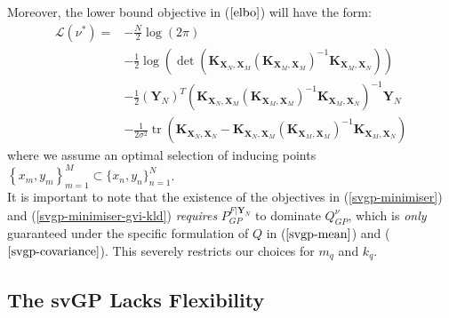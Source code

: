\documentclass{article}
\newcommand{\tr}{\operatorname{tr}}
\numberwithin{equation}{section}
\begin{document}
Moreover, the lower bound objective in ($\ref{elbo}$) will have the form:
\begin{align}
    \label{svgp-optimal-elbo}
    \mathcal{L}(\nu^*) = &-\frac{N}{2} \log\left(2\pi \right)\\
    &-\frac{1}{2} \log \left(\det\left( \mathbf{K}_{\mathbf{X}_N, \mathbf{X}_M}\left(\mathbf{K}_{\mathbf{X}_M, \mathbf{X}_M}\right)^{-1} \mathbf{K}_{\mathbf{X}_M, \mathbf{X}_N}\right)\right)\\
    & -\frac{1}{2} \left(\mathbf{Y}_N\right)^T \left( \mathbf{K}_{\mathbf{X}_N, \mathbf{X}_M}\left(\mathbf{K}_{\mathbf{X}_M, \mathbf{X}_M}\right)^{-1} \mathbf{K}_{\mathbf{X}_M, \mathbf{X}_N}\right)^{-1} \mathbf{Y}_N \\
    &  - \frac{1}{2\sigma^2}\tr\left(\mathbf{K}_{\mathbf{X}_N, \mathbf{X}_N} - \mathbf{K}_{\mathbf{X}_N, \mathbf{X}_M}\left(\mathbf{K}_{\mathbf{X}_M, \mathbf{X}_M}\right)^{-1} \mathbf{K}_{\mathbf{X}_M, \mathbf{X}_N}\right)
\end{align}
where we assume an optimal selection of inducing points $\left\{x_m, y_m\right\}_{m=1}^{M} \subset \{x_n, y_n\}_{n=1}^{N}$.
\\It is important to note that the existence of the objectives in (\ref{svgp-minimiser}) and (\ref{svgp-minimiser-gvi-kld}) \textit{requires} $P_{GP}^{F \vert \mathbf{Y}_N}$ to dominate $Q_{GP}^{\nu}$, which is \textit{only} guaranteed under the specific formulation of $Q$ in ($\ref{svgp-mean}$) and ($\ref{svgp-covariance}$). This severely restricts our choices for $m_q$ and $k_q$.


\subsection{The svGP Lacks Flexibility}
\end{document}
